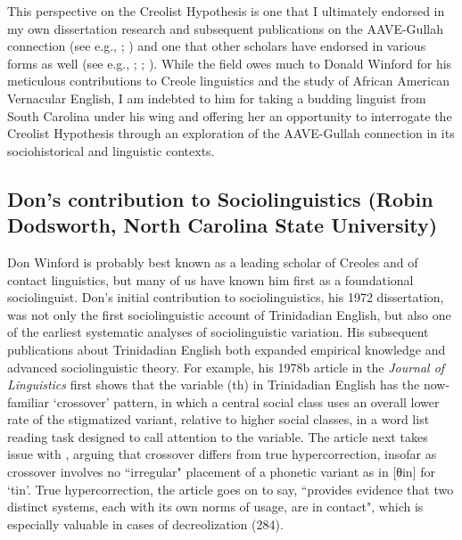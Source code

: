 \documentclass[output=paper, colorlinks,citecolor=brown]{langscibook}
\begin{document}
 This perspective on the Creolist Hypothesis is one that I ultimately endorsed in my own dissertation research \citep{Weldon1998} and subsequent publications on the AAVE-Gullah connection (see e.g., \citealt{Weldon2003copula}; \citealt{Weldon2003revisiting}) and one that other scholars have endorsed in various forms as well (see e.g., \citealt{Mufwene1997}; \citealt{Rickford1997}; \citealt{Rickford1998}). While the field owes much to Donald Winford for his meticulous contributions to Creole linguistics and the study of African American Vernacular English, I am indebted to him for taking a budding linguist from South Carolina under his wing and offering her an opportunity to interrogate the Creolist Hypothesis through an exploration of the AAVE-Gullah connection in its sociohistorical and linguistic contexts. 


\subsection{Don's contribution to Sociolinguistics (Robin Dodsworth, North Carolina State University)}

Don Winford is probably best known as a leading scholar of Creoles and of contact linguistics, but many of us have known him first as a foundational sociolinguist. Don's initial contribution to sociolinguistics, his 1972 dissertation, was not only the first sociolinguistic account of Trinidadian English, but also one of the earliest systematic analyses of sociolinguistic variation. His subsequent publications about Trinidadian English both expanded empirical knowledge and advanced sociolinguistic theory. For example, his 1978b article in the \textit{Journal of Linguistics} first shows that the variable (th) in Trinidadian English has the now-familiar ‘crossover' pattern, in which a central social class uses an overall lower rate of the stigmatized variant, relative to higher social classes, in a word list reading task designed to call attention to the variable. The article next takes issue with \citet{Labov1966}, arguing that crossover differs from true hypercorrection, insofar as crossover involves no “irregular" placement of a phonetic variant as in [θin] for ‘tin'. True hypercorrection, the article goes on to say, “provides evidence that two distinct systems, each with its own norms of usage, are in contact", which is especially valuable in cases of decreolization (284).
\end{document}

